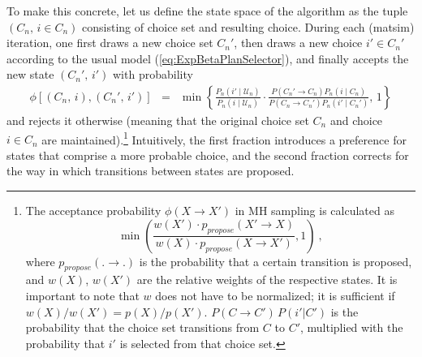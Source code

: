 To make this concrete, let us define the state space of the algorithm 
as the tuple $(C_{n},\, i\in C_{n})$ consisting of choice set and resulting choice.  During each (\gls{matsim}) iteration, one first draws a new choice set $C_{n}'$, then draws a new choice $i'\in C_{n}'$ according to the usual model (\ref{eq:ExpBetaPlanSelector}), and finally accepts the new state $(C_{n}',\, i')$ with probability
\begin{eqnarray}
\phi[(C_{n},\, i),(C_{n}',\, i')] 
& = & 
\min\left\{ 
\frac{{\displaystyle P_{n}(i'\mid \mathcal{U}_n)}}
{{\displaystyle P_{n}(i\mid \mathcal{U}_n)}}
\cdot
\frac{{P(C_{n}'\rightarrow C_{n})P_n(i\mid C_{n})}}
{{P(C_{n}\rightarrow C_{n}')P_n(i'\mid C_{n}')}}
,\,1\right\} 
\label{eq:accept-proba-1}
\end{eqnarray}
and rejects it otherwise (meaning that the original choice set $C_{n}$
and choice $i\in C_{n}$ are maintained).\footnote{%
%
The acceptance probability $\phi(X \to X')$ in MH sampling is calculated as
\[
\min\left(\frac{w(X') \cdot p_{propose}(X' \to X)}{w(X) \cdot p_{propose}(X \to X')},1\right) \ ,
\]
where $p_{propose}(. \to .)$ is the probability that a certain transition is proposed, and $w(X)$, $w(X')$ are the relative weights of the respective states.  It is important to note that $w$ does not have to be normalized; it is sufficient if $w(X)/w(X') = p(X)/p(X')$.  $P(C \to C') \, P(i'|C')$ is the probability that the choice set transitions from $C$ to $C'$, multiplied with the probability that $i'$ is selected from that choice set.
%
}
Intuitively, the first fraction introduces a preference for states
that comprise a more probable choice, and the second
fraction corrects for the way in which transitions between states are
proposed.


